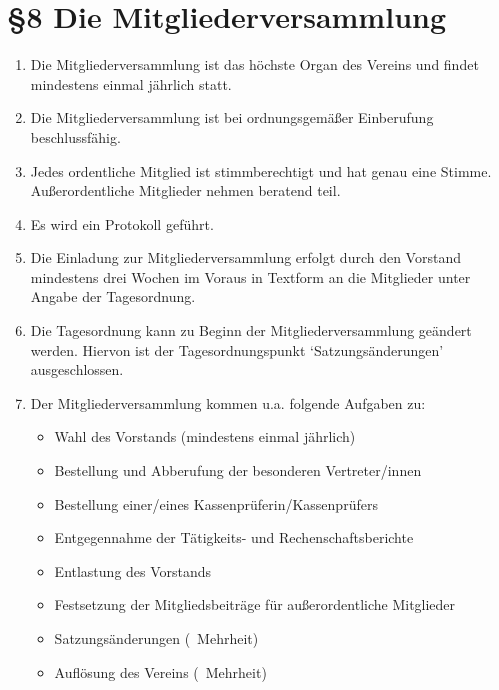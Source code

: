 \documentclass[ngerman]{article}
\begin{document}
\section*{§8 Die Mitgliederversammlung}
\begin{enumerate}
 \item Die Mitgliederversammlung ist das höchste Organ des Vereins und findet mindestens einmal jährlich statt.
 \item Die Mitgliederversammlung ist bei ordnungsgemäßer Einberufung beschlussfähig.
 \item Jedes ordentliche Mitglied ist stimmberechtigt und hat genau eine Stimme. Außerordentliche Mitglieder nehmen beratend teil.
 \item Es wird ein Protokoll geführt.
 \item Die Einladung zur Mitgliederversammlung erfolgt durch den Vorstand mindestens drei Wochen im Voraus in Textform an die Mitglieder unter Angabe der Tagesordnung.
 \item Die Tagesordnung kann zu Beginn der Mitgliederversammlung geändert werden. Hiervon ist der Tagesordnungspunkt `Satzungsänderungen' ausgeschlossen.
 \item Der Mitgliederversammlung kommen u.a. folgende Aufgaben zu:
 \begin{itemize}
  \item Wahl des Vorstands (mindestens einmal jährlich)
  \item Bestellung und Abberufung der besonderen Vertreter/innen
  \item Bestellung einer/eines Kassenprüferin/Kassenprüfers
  \item Entgegennahme der Tätigkeits- und Rechenschaftsberichte
  \item Entlastung des Vorstands
  \item Festsetzung der Mitgliedsbeiträge für außerordentliche Mitglieder
  \item Satzungsänderungen (\ Mehrheit)
  \item Auflösung des Vereins (\ Mehrheit)
 \end{itemize}
\end{enumerate}
\end{document}
